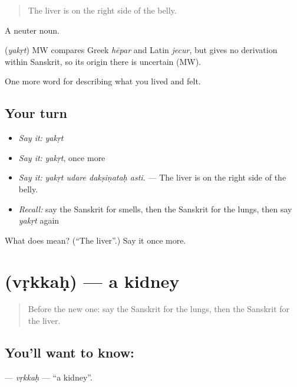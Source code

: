 \begin{quote}
The liver is on the right side of the belly.
\end{quote}

A neuter noun.

\begin{cousinweb}
\textbf{} (\emph{yakṛt}) MW compares Greek \emph{hēpar} and Latin \emph{jecur}, but gives no derivation within Sanskrit, so its origin there is uncertain (MW).
\end{cousinweb}

\begin{grammarlens}[title={What you've built}]
One more word for describing what you lived and felt.
\end{grammarlens}

\subsection*{Your turn}
\begin{itemize}
\raggedright
  \item \emph{Say it:} \emph{yakṛt}
  \item \emph{Say it:} \emph{yakṛt}, once more
  \item \emph{Say it:} \emph{yakṛt udare dakṣiṇataḥ asti.} — The liver is on the right side of the belly.
  \item \emph{Recall:} say the Sanskrit for smells, then the Sanskrit for the lungs, then say \emph{yakṛt} again
\end{itemize}

\begin{tcolorbox}[breakable,colback=teal!4,colframe=teal!35!black,title={Before you move on}]
What does  mean? (\textquotedblleft{}The liver\textquotedblright{}.) Say it once more.
\end{tcolorbox}
\section[\texorpdfstring{\sk{वृक्कः} (vṛkkaḥ)}{वृक्कः (vṛkkaḥ)}]{ (vṛkkaḥ) — a kidney}

\label{lesson:SA-C470-vrkkah}



\begin{quote}
Before the new one: say the Sanskrit for the lungs, then the Sanskrit for the liver.
\end{quote}

\subsection*{You'll want to know: }
\textbf{} — \emph{vṛkkaḥ} — \textquotedblleft{}a kidney\textquotedblright{}.

